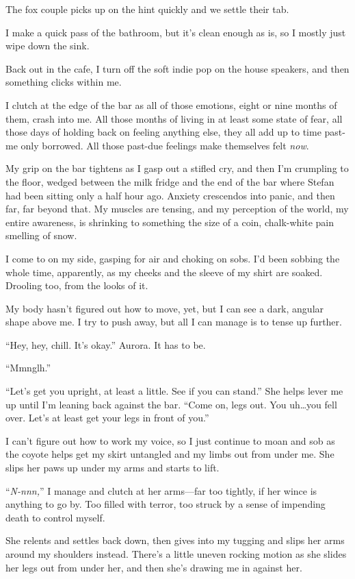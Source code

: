 The fox couple picks up on the hint quickly and we settle their tab.

I make a quick pass of the bathroom, but it's clean enough as is, so I mostly just wipe down the sink.

Back out in the cafe, I turn off the soft indie pop on the house speakers, and then something clicks within me.

I clutch at the edge of the bar as all of those emotions, eight or nine months of them, crash into me. All those months of living in at least some state of fear, all those days of holding back on feeling anything else, they all add up to time past-me only borrowed. All those past-due feelings make themselves felt \emph{now}.

My grip on the bar tightens as I gasp out a stifled cry, and then I'm crumpling to the floor, wedged between the milk fridge and the end of the bar where Stefan had been sitting only a half hour ago. Anxiety crescendos into panic, and then far, far beyond that. My muscles are tensing, and my perception of the world, my entire awareness, is shrinking to something the size of a coin, chalk-white pain smelling of snow.

I come to on my side, gasping for air and choking on sobs. I'd been sobbing the whole time, apparently, as my cheeks and the sleeve of my shirt are soaked. Drooling too, from the looks of it.

My body hasn't figured out how to move, yet, but I can see a dark, angular shape above me. I try to push away, but all I can manage is to tense up further.

``Hey, hey, chill. It's okay.'' Aurora. It has to be.

``Mmnglh.''

``Let's get you upright, at least a little. See if you can stand.'' She helps lever me up until I'm leaning back against the bar. ``Come on, legs out. You uh\ldots{}you fell over. Let's at least get your legs in front of you.''

I can't figure out how to work my voice, so I just continue to moan and sob as the coyote helps get my skirt untangled and my limbs out from under me. She slips her paws up under my arms and starts to lift.

``\emph{N-nnn,}'' I manage and clutch at her arms---far too tightly, if her wince is anything to go by. Too filled with terror, too struck by a sense of impending death to control myself.

She relents and settles back down, then gives into my tugging and slips her arms around my shoulders instead. There's a little uneven rocking motion as she slides her legs out from under her, and then she's drawing me in against her.


